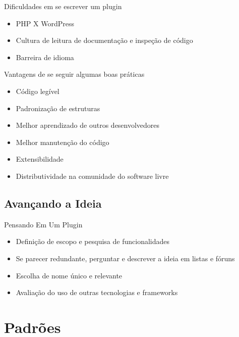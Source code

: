 \documentclass{beamer}
\begin{document}
\begin{frame}{Dificuldades em se escrever um plugin}
\begin{itemize}
  \pause \item PHP X WordPress
  \pause \item Cultura de leitura de documentação e inspeção de código
  \pause \item Barreira de idioma
\end{itemize}
\end{frame}

\begin{frame}{Vantagens de se seguir algumas boas práticas}
\begin{itemize}
  \pause \item Código legível
  \pause \item Padronização de estruturas
  \pause \item Melhor aprendizado de outros desenvolvedores
  \pause \item Melhor manutenção do código
  \pause \item Extensibilidade
  \pause \item Distributividade na comunidade do software livre
\end{itemize}
\end{frame}

\subsection{Avançando a Ideia}

\begin{frame}{Pensando Em Um Plugin}
\begin{itemize}
  \pause \item Definição de escopo e pesquisa de funcionalidades
  \pause \item Se parecer redundante, perguntar e descrever a
    ideia em listas e fóruns
  \pause \item Escolha de nome único e relevante
  \pause \item Avaliação do uso de outras tecnologias e frameworks
\end{itemize}
\end{frame}

\section{Padrões}

\begin{frame}\end{frame}
\end{document}
